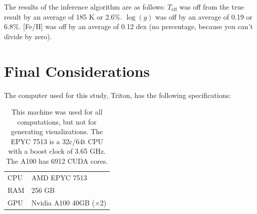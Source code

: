 \documentclass[twocolumn]{aastex631}
\begin{document}
The results of the inference algorithm are as follows: $T_{\mathrm{eff}}$ was
off from the true result by an average of 185 K or 2.6\%. $\log(g)$ was off 
by an average of 0.19 or 6.8\%. [Fe/H] was off by an average of 0.12 dex (no 
percentage, because you can't divide by zero).

\section{Final Considerations}
The computer used for this study, Triton, has the following specifications:
\begin{table}[h!]
    \centering
    \begin{tabular}{ll}
        \hline
        CPU & AMD EPYC 7513\\
        RAM & 256 GB\\
        GPU & Nvidia A100 40GB ($\times$2)\\
        \hline
    \end{tabular}
    \caption{This machine was used for all computations, but not 
    for generating visualizations. The EPYC 7513 is a 32c/64t CPU with a 
    boost clock of 3.65 GHz. The A100 has 6912 CUDA cores.}
\end{table}
\end{document}
